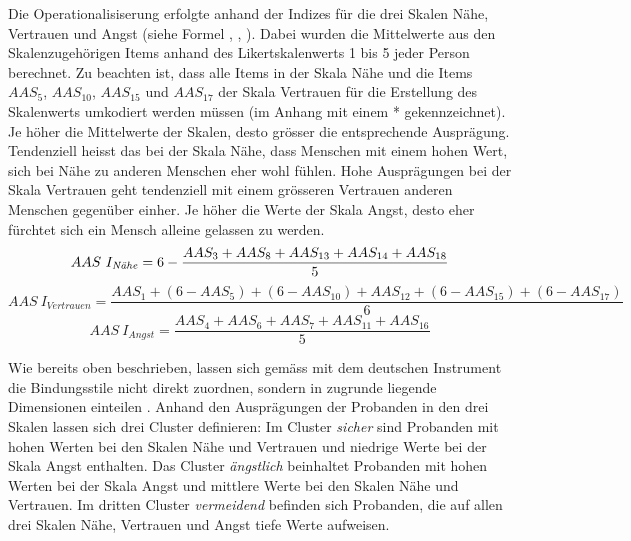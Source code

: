 Die Operationalisiserung erfolgte anhand der Indizes für die drei Skalen Nähe, Vertrauen und Angst (siehe Formel , , ). Dabei wurden die Mittelwerte aus den Skalenzugehörigen Items anhand des Likertskalenwerts 1 bis 5 jeder Person berechnet. Zu beachten ist, dass alle Items in der Skala Nähe und die Items $AAS_{5}$, $AAS_{10}$, $AAS_{15}$ und $AAS_{17}$ der Skala Vertrauen für die Erstellung des Skalenwerts umkodiert werden müssen (im Anhang  mit einem * gekennzeichnet). Je höher die Mittelwerte der Skalen, desto grösser die entsprechende Ausprägung. Tendenziell heisst das bei der Skala Nähe, dass Menschen mit einem hohen Wert, sich bei Nähe zu anderen Menschen eher wohl fühlen. Hohe Ausprägungen bei der Skala Vertrauen geht tendenziell mit einem grösseren Vertrauen anderen Menschen gegenüber einher. Je höher die Werte der Skala Angst, desto eher fürchtet sich ein Mensch alleine gelassen zu werden.
\begin{equation}\label{eq:IndexNähe}
    AAS~I_{\text{\textit{N{\"a}he}}}=6-\frac{AAS_{3}+AAS_{8}+AAS_{13}+AAS_{14}+AAS_{18}}{5}
\end{equation}
\begin{equation}\label{eq:IndexVertrauen}
    AAS~I_{Vertrauen}=\frac{AAS_{1}+(6-AAS_{5})+(6-AAS_{10})+AAS_{12}+(6-AAS_{15})+(6-AAS_{17})}{6}
\end{equation}
\begin{equation}\label{eq:IndexAngst}
    AAS~I_{Angst}=\frac{AAS_{4}+AAS_{6}+AAS_{7}+AAS_{11}+AAS_{16}}{5}
\end{equation}

Wie bereits oben beschrieben, lassen sich gemäss  mit dem deutschen Instrument die Bindungsstile nicht direkt zuordnen, sondern in zugrunde liegende Dimensionen einteilen \cite{Schuetzmann2004}. Anhand den Ausprägungen der Probanden in den drei Skalen lassen sich drei Cluster definieren: Im Cluster \textit{sicher} sind Probanden mit hohen Werten bei den Skalen Nähe und Vertrauen und niedrige Werte bei der Skala Angst enthalten. Das Cluster \textit{ängstlich} beinhaltet Probanden mit hohen Werten bei der Skala Angst und mittlere Werte bei den Skalen Nähe und Vertrauen. Im dritten Cluster \textit{vermeidend} befinden sich Probanden, die auf allen drei Skalen Nähe, Vertrauen und Angst tiefe Werte aufweisen.


